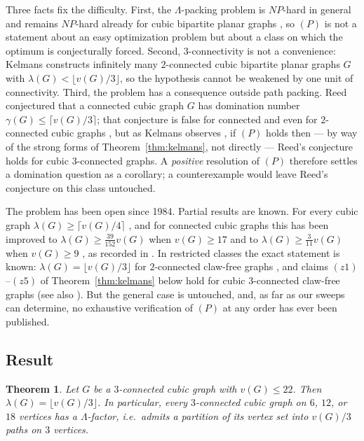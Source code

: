 \documentclass[11pt]{amsart}
\newcommand{\Lam}{\Lambda}
\newcommand{\vv}{v}
\theoremstyle{plain}
\newtheorem{theorem}{Theorem}[section]
\theoremstyle{definition}
\theoremstyle{remark}
\begin{document}
Three facts fix the difficulty. First, the $\Lam$-packing problem is
$NP$-hard in general \cite{HK86} and remains $NP$-hard already for cubic
bipartite planar graphs \cite{KMZ05}, so $(P)$ is not
a statement about an easy optimization problem but about a class on which
the optimum is conjecturally forced. Second, $3$-connectivity is not a
convenience: Kelmans \cite{Kel07} constructs infinitely many $2$-connected
cubic bipartite planar graphs $G$ with $\lambda(G)<\lfloor
\vv(G)/3\rfloor$, so the hypothesis cannot be weakened by one unit of
connectivity. Third, the problem has a consequence outside path packing.
Reed \cite{Reed96} conjectured that a connected cubic graph $G$ has
domination number $\gamma(G)\le\lceil \vv(G)/3\rceil$; that conjecture is
false for connected and even for $2$-connected cubic graphs
\cite{Kel06,KS05}, but as Kelmans observes \cite[\S1]{Kel11}, if $(P)$
holds then --- by way of the strong forms of
Theorem~\ref{thm:kelmans}, not directly --- Reed's conjecture holds for
cubic $3$-connected graphs. A \emph{positive} resolution of $(P)$
therefore settles a domination question as a corollary; a counterexample
would leave Reed's conjecture on this class untouched.

The problem has been open since 1984. Partial results are known. For
every cubic graph $\lambda(G)\ge\lceil \vv(G)/4\rceil$ \cite{KM04}, and
for connected cubic graphs this has been improved to
$\lambda(G)\ge\frac{39}{152}\vv(G)$ when $\vv(G)\ge 17$ \cite{KMZ08} and
to $\lambda(G)\ge\frac{3}{11}\vv(G)$ when $\vv(G)\ge 9$ \cite{KZ08}, as
recorded in \cite[1.3, 1.6, 1.8]{Kel11}. In restricted classes the exact
statement is known: $\lambda(G)=\lfloor \vv(G)/3\rfloor$ for
$2$-connected claw-free graphs \cite{KKN01}, and claims $(z1)$--$(z5)$ of
Theorem~\ref{thm:kelmans} below hold for cubic $3$-connected claw-free
graphs \cite{Kel07b} (see also \cite{Kel11b}). But the general case is
untouched, and, as far as our sweeps can determine, no exhaustive
verification of $(P)$ at any order has ever been published.

\subsection{Result}\label{ssec:result}

\begin{theorem}\label{thm:main}
Let $G$ be a $3$-connected cubic graph with $\vv(G)\le 22$. Then
$\lambda(G)=\lfloor \vv(G)/3\rfloor$. In particular, every $3$-connected
cubic graph on $6$, $12$, or $18$ vertices has a $\Lam$-factor, i.e.\
admits a partition of its vertex set into $\vv(G)/3$ paths on $3$
vertices.
\end{theorem}
\end{document}
